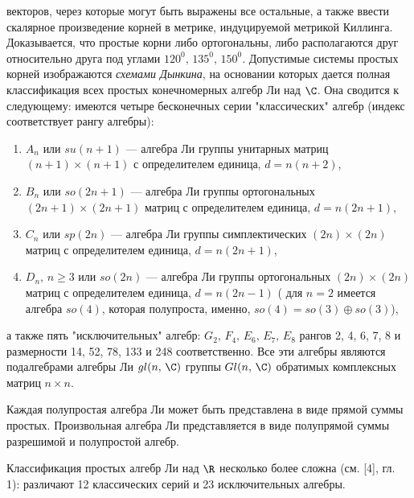 \documentclass[a4paper
]{article}
\begin{document}
векторов, через которые могут быть выражены все остальные, а также
ввести скалярное произведение корней в метрике, индуцируемой
метрикой Киллинга. Доказывается, что простые корни либо
ортогональны, либо располагаются друг относительно друга под
углами $120^0,\, 135^0 ,\,150^0$. Допустимые системы простых
корней изображаются {\em схемами Дынкина}, на основании которых
дается полная классификация всех простых конечномерных алгебр Ли
над $\C$. Она сводится к следующему: имеются четыре бесконечных
серии "классических" алгебр (индекс соответствует рангу алгебры):
\begin{enumerate}\item $A_n$ или $su(n+1)$ --- алгебра Ли группы
унитарных матриц $(n+1)\times(n+1)$ с определителем единица, $
d=n(n+2)$,\item $B_n$ или $so(2n+1)$ --- алгебра Ли группы
ортогональных $(2n+1)\times(2n+1)$ матриц с определителем единица,
$d=n(2n+1),$\item $C_n$ или $sp(2n)$ --- алгебра Ли группы
симплектических $(2n)\times(2n)$ матриц с определителем единица,
$d=n(2n+1)$,\item $D_n,\, n\geq 3$ или $so(2n)$ --- алгебра Ли
группы ортогональных $(2n)\times(2n)$ матриц с определителем
единица, $d=n(2n-1)$ ( для $n=2$ имеется алгебра $so(4)$, которая
полупроста, именно, $so(4)=so(3)\oplus so(3)$),
\end{enumerate} а также пять "исключительных" алгебр:
$G_2,\,F_4,\,E_6,\,E_7,\,E_8$ рангов 2, 4, 6, 7, 8 и размерности
14, 52, 78, 133 и 248 соответственно. Все эти алгебры являются
подалгебрами алгебры Ли $gl(n,\,\C)$ группы  $Gl(n,\,\C)$
обратимых комплексных матриц $n\times n$.\par Каждая полупростая
алгебра Ли может быть представлена в виде прямой суммы простых.
Произвольная алгебра Ли представляется в виде полупрямой суммы
разрешимой и полупростой алгебр.
\par
Классификация  простых алгебр Ли над $\R$ несколько более сложна
(см. [4], гл. 1): различают 12 классических серий и 23
исключительных алгебры.
\end{document}
